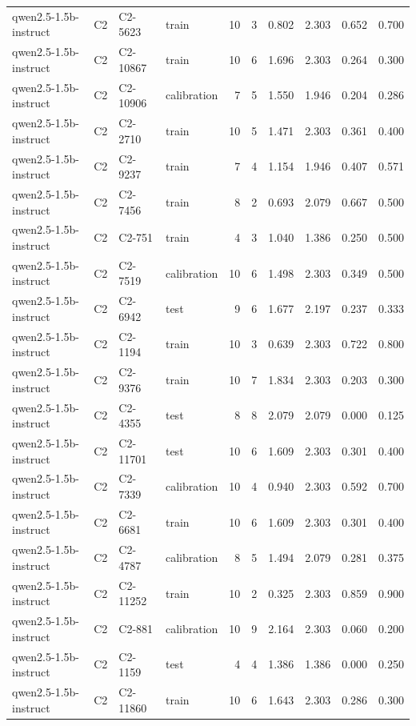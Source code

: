 \begin{table}
\begin{tabular}{llllrrrrrr}
qwen2.5-1.5b-instruct & C2 & C2-5623 & train & 10 & 3 & 0.802 & 2.303 & 0.652 & 0.700 \\
qwen2.5-1.5b-instruct & C2 & C2-10867 & train & 10 & 6 & 1.696 & 2.303 & 0.264 & 0.300 \\
qwen2.5-1.5b-instruct & C2 & C2-10906 & calibration & 7 & 5 & 1.550 & 1.946 & 0.204 & 0.286 \\
qwen2.5-1.5b-instruct & C2 & C2-2710 & train & 10 & 5 & 1.471 & 2.303 & 0.361 & 0.400 \\
qwen2.5-1.5b-instruct & C2 & C2-9237 & train & 7 & 4 & 1.154 & 1.946 & 0.407 & 0.571 \\
qwen2.5-1.5b-instruct & C2 & C2-7456 & train & 8 & 2 & 0.693 & 2.079 & 0.667 & 0.500 \\
qwen2.5-1.5b-instruct & C2 & C2-751 & train & 4 & 3 & 1.040 & 1.386 & 0.250 & 0.500 \\
qwen2.5-1.5b-instruct & C2 & C2-7519 & calibration & 10 & 6 & 1.498 & 2.303 & 0.349 & 0.500 \\
qwen2.5-1.5b-instruct & C2 & C2-6942 & test & 9 & 6 & 1.677 & 2.197 & 0.237 & 0.333 \\
qwen2.5-1.5b-instruct & C2 & C2-1194 & train & 10 & 3 & 0.639 & 2.303 & 0.722 & 0.800 \\
qwen2.5-1.5b-instruct & C2 & C2-9376 & train & 10 & 7 & 1.834 & 2.303 & 0.203 & 0.300 \\
qwen2.5-1.5b-instruct & C2 & C2-4355 & test & 8 & 8 & 2.079 & 2.079 & 0.000 & 0.125 \\
qwen2.5-1.5b-instruct & C2 & C2-11701 & test & 10 & 6 & 1.609 & 2.303 & 0.301 & 0.400 \\
qwen2.5-1.5b-instruct & C2 & C2-7339 & calibration & 10 & 4 & 0.940 & 2.303 & 0.592 & 0.700 \\
qwen2.5-1.5b-instruct & C2 & C2-6681 & train & 10 & 6 & 1.609 & 2.303 & 0.301 & 0.400 \\
qwen2.5-1.5b-instruct & C2 & C2-4787 & calibration & 8 & 5 & 1.494 & 2.079 & 0.281 & 0.375 \\
qwen2.5-1.5b-instruct & C2 & C2-11252 & train & 10 & 2 & 0.325 & 2.303 & 0.859 & 0.900 \\
qwen2.5-1.5b-instruct & C2 & C2-881 & calibration & 10 & 9 & 2.164 & 2.303 & 0.060 & 0.200 \\
qwen2.5-1.5b-instruct & C2 & C2-1159 & test & 4 & 4 & 1.386 & 1.386 & 0.000 & 0.250 \\
qwen2.5-1.5b-instruct & C2 & C2-11860 & train & 10 & 6 & 1.643 & 2.303 & 0.286 & 0.300 \\

\end{tabular}
\end{table}
